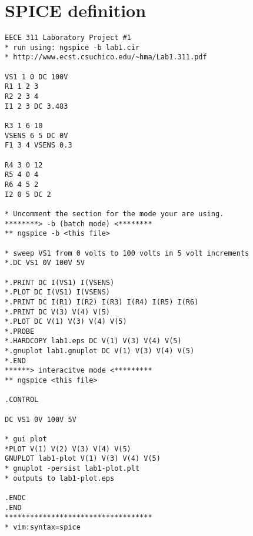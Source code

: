 \documentclass{article}
\begin{document}
\appendix


\section{SPICE definition}\label{sec:spicedef}

{\footnotesize
\begin{verbatim}
EECE 311 Laboratory Project #1
* run using: ngspice -b lab1.cir
* http://www.ecst.csuchico.edu/~hma/Lab1.311.pdf

VS1 1 0 DC 100V
R1 1 2 3
R2 2 3 4
I1 2 3 DC 3.483

R3 1 6 10
VSENS 6 5 DC 0V
F1 3 4 VSENS 0.3

R4 3 0 12
R5 4 0 4
R6 4 5 2
I2 0 5 DC 2

* Uncomment the section for the mode your are using.
********> -b (batch mode) <********
** ngspice -b <this file>

* sweep VS1 from 0 volts to 100 volts in 5 volt increments
*.DC VS1 0V 100V 5V

*.PRINT DC I(VS1) I(VSENS)
*.PLOT DC I(VS1) I(VSENS)
*.PRINT DC I(R1) I(R2) I(R3) I(R4) I(R5) I(R6)
*.PRINT DC V(3) V(4) V(5)
*.PLOT DC V(1) V(3) V(4) V(5)
*.PROBE
*.HARDCOPY lab1.eps DC V(1) V(3) V(4) V(5)
*.gnuplot lab1.gnuplot DC V(1) V(3) V(4) V(5)
*.END
******> interacitve mode <*********
** ngspice <this file>

.CONTROL

DC VS1 0V 100V 5V

* gui plot
*PLOT V(1) V(2) V(3) V(4) V(5)
GNUPLOT lab1-plot V(1) V(3) V(4) V(5)
* gnuplot -persist lab1-plot.plt
* outputs to lab1-plot.eps

.ENDC
.END
***********************************
* vim:syntax=spice

\end{verbatim}
}

\end{document}
